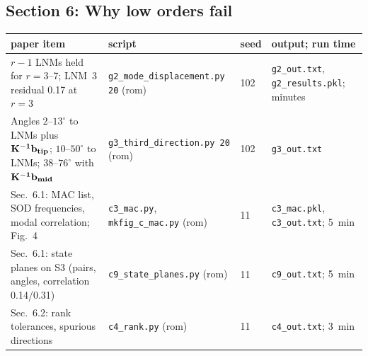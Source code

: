 \documentclass[10pt]{article}
\newcommand{\f}[1]{\texttt{#1}}
\begin{document}
\subsection*{Section 6: Why low orders fail}
\begin{longtable}{L{0.31\textwidth}L{0.25\textwidth}L{0.08\textwidth}L{0.25\textwidth}}
\toprule
paper item & script & seed & output; run time\\ \midrule
$r-1$ LNMs held for $r=3$--7; LNM~3 residual 0.17 at $r=3$ & \f{g2\_\allowbreak{}mode\_\allowbreak{}displacement.py 20} (rom) & 102 & \f{g2\_\allowbreak{}out.txt}, \f{g2\_\allowbreak{}results.pkl}; minutes\\
Angles $2$--$13^\circ$ to LNMs plus $\bf K^{-1}b_{tip}$; $10$--$50^\circ$ to LNMs; $38$--$76^\circ$ with $\bf K^{-1}b_{mid}$ & \f{g3\_\allowbreak{}third\_\allowbreak{}direction.py 20} (rom) & 102 & \f{g3\_\allowbreak{}out.txt}\\
Sec.~6.1: MAC list, SOD frequencies, modal correlation; Fig.~4 & \f{c3\_\allowbreak{}mac.py}, \f{mkfig\_\allowbreak{}c\_\allowbreak{}mac.py} (rom) & 11 & \f{c3\_\allowbreak{}mac.pkl}, \f{c3\_\allowbreak{}out.txt}; 5~min\\
Sec.~6.1: state planes on S3 (pairs, angles, correlation 0.14/0.31) & \f{c9\_\allowbreak{}state\_\allowbreak{}planes.py} (rom) & 11 & \f{c9\_\allowbreak{}out.txt}; 5~min\\
Sec.~6.2: rank tolerances, spurious directions & \f{c4\_\allowbreak{}rank.py} (rom) & 11 & \f{c4\_\allowbreak{}out.txt}; 3~min\\
\bottomrule
\end{longtable}
\end{document}
